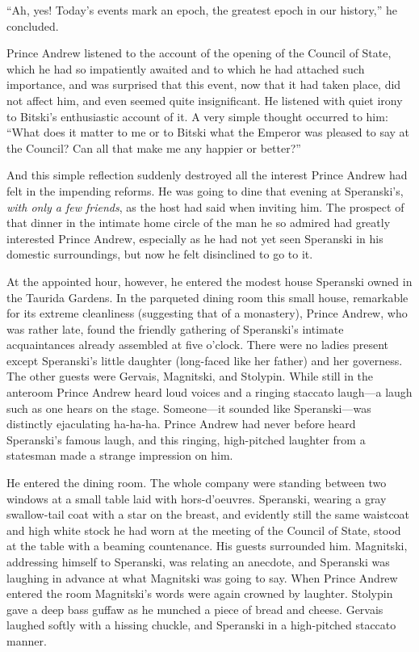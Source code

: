 ``Ah, yes! Today's events mark an epoch, the greatest epoch in
our history,'' he concluded.

Prince Andrew listened to the account of the opening of the
Council of State, which he had so impatiently awaited and to
which he had attached such importance, and was surprised that
this event, now that it had taken place, did not affect him, and
even seemed quite insignificant. He listened with quiet irony to
Bitski's enthusiastic account of it. A very simple thought
occurred to him: ``What does it matter to me or to Bitski what
the Emperor was pleased to say at the Council? Can all that make
me any happier or better?''

And this simple reflection suddenly destroyed all the interest
Prince Andrew had felt in the impending reforms. He was going to
dine that evening at Speranski's, \emph{with only a few friends},
as the host had said when inviting him. The prospect of that
dinner in the intimate home circle of the man he so admired had
greatly interested Prince Andrew, especially as he had not yet
seen Speranski in his domestic surroundings, but now he felt
disinclined to go to it.

At the appointed hour, however, he entered the modest house
Speranski owned in the Taurida Gardens. In the parqueted dining
room this small house, remarkable for its extreme cleanliness
(suggesting that of a monastery), Prince Andrew, who was rather
late, found the friendly gathering of Speranski's intimate
acquaintances already assembled at five o'clock. There were no
ladies present except Speranski's little daughter (long-faced
like her father) and her governess. The other guests were
Gervais, Magnitski, and Stolypin. While still in the anteroom
Prince Andrew heard loud voices and a ringing staccato laugh---a
laugh such as one hears on the stage. Someone---it sounded like
Speranski---was distinctly ejaculating ha-ha-ha. Prince Andrew
had never before heard Speranski's famous laugh, and this
ringing, high-pitched laughter from a statesman made a strange
impression on him.

He entered the dining room. The whole company were standing
between two windows at a small table laid with
hors-d'oeuvres. Speranski, wearing a gray swallow-tail coat with
a star on the breast, and evidently still the same waistcoat and
high white stock he had worn at the meeting of the Council of
State, stood at the table with a beaming countenance. His guests
surrounded him. Magnitski, addressing himself to Speranski, was
relating an anecdote, and Speranski was laughing in advance at
what Magnitski was going to say. When Prince Andrew entered the
room Magnitski's words were again crowned by laughter. Stolypin
gave a deep bass guffaw as he munched a piece of bread and
cheese. Gervais laughed softly with a hissing chuckle, and
Speranski in a high-pitched staccato manner.

